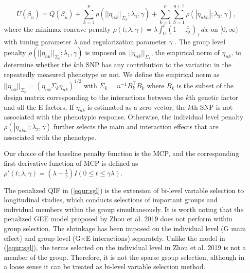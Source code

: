 \documentclass[12pt]{article}
\begin{document}
\begin{equation}\label{equr:sgl}
	U(\beta_n)=Q(\beta_n)+\sum_{k=1}^{p}\rho(||\eta_{nk}||_{\Sigma_{k}};\lambda_{1},\gamma)+\sum_{k=1}^{p} \sum_{h=1}^{q+1}\rho  (|\eta_{nkh}|;\lambda_{2},\gamma),
\end{equation}
\noindent where the minimax concave penalty $\rho(t;\lambda,\gamma)=\lambda \int_{0}^{t}(1-\frac{x}{\gamma \lambda})_{+}dx$ on $[0,\infty)$ with tuning parameter $\lambda$ and regularization parameter $\gamma$ \cite{Zhang2010}. The group level penalty  $\rho(||\eta_{nk}||_{\Sigma_{k}};\lambda_{1},\gamma)$ is imposed on $||\eta_{nk}||_{\Sigma_{k}}$, the empirical norm of $\eta_{nk}$, to determine whether the $k$th SNP has any contribution to the variation in the repeatedly measured phenotype or not. {\color{blue} We define the empirical norm as $||\eta_{nk}||_{\Sigma_{k}}=(\eta_{nk} \Sigma_k \eta_{nk})^{1/2}$ with ${\Sigma_{k}}=n^{-1}B_{k}^\top B_{k}$ where $B_{k}$ is the subset of the design matrix corresponding to the interactions between the $k$th genetic factor and all the E factors.} If $\eta_{nk}$ is estimated as a zero vector, the $k$th SNP is not associated with the phenotypic response. Otherwise, the individual level penalty $\rho (|\eta_{nkh}|;\lambda_{2},\gamma)$ further selects the main and interaction effects that are associated with the phenotype.  


Our choice of the baseline penalty function is the MCP, and the corresponding first derivative function of MCP is defined as $\rho' (t;\lambda,\gamma)=(\lambda-\frac{t}{\gamma})I(0 \leq t \leq \gamma \lambda)$. 

The penalized QIF in (\ref{equr:sgl}) is the extension of bi-level variable selection to longitudinal studies, which conducts selections of important groups and individual members within the group simultaneously. It is worth noting that the penalized GEE model proposed by Zhou et al. 2019 \cite{zhou2019penalized} does not perform within group selection. The shrinkage has been imposed on the individual level (G main effect) and group level (G$\times$E interactions) separately. Unlike the model in (\ref{equr:sgl}), the terms selected on the individual level in Zhou et al. 2019 \cite{zhou2019penalized} is not a member of the group. Therefore, it is not the sparse group selection, although in a loose sense it can be treated as bi-level variable selection method.
\end{document}
